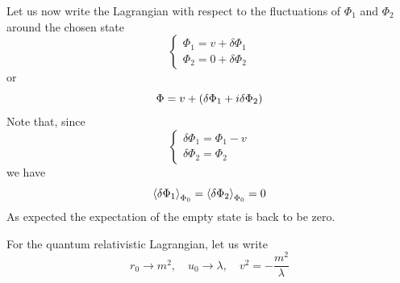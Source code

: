\documentclass[../main/main.tex]{subfiles}
\begin{document}
Let us now write the Lagrangian with respect to the fluctuations of \( \Phi _1  \)  and \( \Phi _2 \) around the chosen state
\begin{equation}
  \begin{cases}
   \Phi _1 = v + \delta \Phi _1\\
   \Phi _2 = 0 + \delta \Phi _2
  \end{cases}
\end{equation}
or
\begin{equation}
  \Phi = v + \qty(\delta \Phi _1 + i \delta \Phi _2)
\end{equation}
Note that, since
\begin{equation}
  \begin{cases}
   \delta \Phi _1 = \Phi _1 - v\\
   \delta \Phi _2 = \Phi _2
  \end{cases}
\end{equation}
we have
\begin{equation}
  \expval{\delta \Phi _1} _{\Phi _0 } = \expval{\delta \Phi _2}_{\Phi _0} = 0
\end{equation}
As expected the expectation of the empty state is back to be zero.

For the quantum relativistic Lagrangian, let us write
\begin{equation}
  r_0 \rightarrow m^2, \quad u_0 \rightarrow \lambda , \quad v^2 = - \frac{m^2}{\lambda }
\end{equation}
\end{document}
